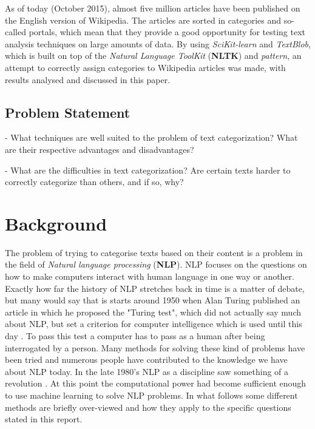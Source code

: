 \documentclass[a4paper]{article}
\begin{document}
\noindent As of today (October 2015), almost five million articles have been published on the English version of Wikipedia\cite{wikipedia}. The articles are sorted in categories and so-called portals, which mean that they provide a good opportunity for testing text analysis techniques on large amounts of data. By using \textit{SciKit-learn} and \textit{TextBlob}, which is built on top of the \textit{Natural Language ToolKit} (\textbf{NLTK}) and \textit{pattern}\cite{textblob}, an attempt to correctly assign categories to Wikipedia articles was made, with results analysed and discussed in this paper. 

\vspace{3mm}

\subsection{Problem Statement}

\vspace{3mm}


- What techniques are well suited to the problem of text categorization? What are their respective advantages and disadvantages?

\vspace{3mm}

- What are the difficulties in text categorization? Are certain texts harder to correctly categorize than others, and if so, why?


\vspace{3mm}


\section{Background}

\vspace{3mm}

The problem of trying to categorise texts based on their content is a problem in the field of \textit{Natural language processing} (\textbf{NLP}). NLP focuses on the questions on how to make computers interact with human language in one way or another.\\

\noindent Exactly how far the history of NLP stretches back in time is a matter of debate, but many would say that is starts around 1950 when Alan Turing published an article in which he proposed the "Turing test", which did not actually say much about NLP, but set a criterion for computer intelligence which is used until this day \cite{AI}. To pass this test a computer has to pass as a human after being interrogated by a person. Many methods for solving these kind of problems have been tried and numerous people have contributed to the knowledge we have about NLP today. In the late 1980's NLP as a discipline saw something of a revolution \cite{historyNLP}. At this point the computational power had become sufficient enough to use machine learning to solve NLP problems. In what follows some different methods are briefly over-viewed and how they apply to the specific questions stated in this report.\\
\end{document}
